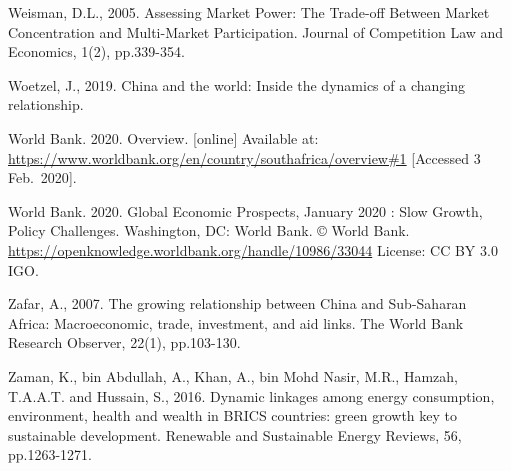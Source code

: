 \documentclass[11pt,preprint, authoryear]{elsarticle}
\numberwithin{equation}{section}
\numberwithin{figure}{section}
\numberwithin{table}{section}
\begin{document}
Weisman, D.L., 2005. Assessing Market Power: The Trade-off Between
Market Concentration and Multi-Market Participation. Journal of
Competition Law and Economics, 1(2), pp.339-354.

Woetzel, J., 2019. China and the world: Inside the dynamics of a
changing relationship.

World Bank. 2020. Overview. {[}online{]} Available at:
\url{https://www.worldbank.org/en/country/southafrica/overview\#1}
{[}Accessed 3 Feb.~2020{]}.

World Bank. 2020. Global Economic Prospects, January 2020 : Slow Growth,
Policy Challenges. Washington, DC: World Bank. © World Bank.
\url{https://openknowledge.worldbank.org/handle/10986/33044} License: CC
BY 3.0 IGO.

Zafar, A., 2007. The growing relationship between China and Sub-Saharan
Africa: Macroeconomic, trade, investment, and aid links. The World Bank
Research Observer, 22(1), pp.103-130.

Zaman, K., bin Abdullah, A., Khan, A., bin Mohd Nasir, M.R., Hamzah,
T.A.A.T. and Hussain, S., 2016. Dynamic linkages among energy
consumption, environment, health and wealth in BRICS countries: green
growth key to sustainable development. Renewable and Sustainable Energy
Reviews, 56, pp.1263-1271.




\end{document}
